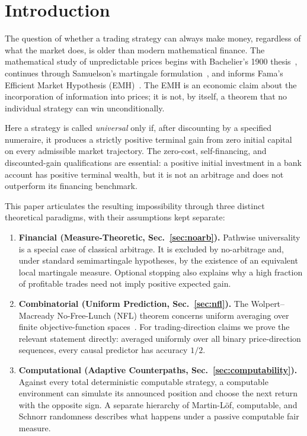 \documentclass[aps,pra,reprint,superscriptaddress,amsmath,amssymb,floatfix]{revtex4-2}
\theoremstyle{plain}
\theoremstyle{definition}
\theoremstyle{remark}
\begin{document}
\section{Introduction}
\label{sec:intro}

The question of whether a trading strategy can always make money, regardless
of what the market does, is older than modern mathematical finance. The
mathematical study of unpredictable prices begins with Bachelier's 1900
thesis~\cite{Bachelier1900}, continues through Samuelson's martingale
formulation~\cite{Samuelson1965}, and informs Fama's Efficient Market
Hypothesis (EMH)~\cite{Fama1970}. The EMH is an economic claim about the
incorporation of information into prices; it is not, by itself, a theorem that
no individual strategy can win unconditionally.

Here a strategy is called \emph{universal} only if, after discounting by a
specified numeraire, it produces a strictly positive terminal gain from zero
initial capital on every admissible market trajectory. The zero-cost,
self-financing, and discounted-gain qualifications are essential: a positive
initial investment in a bank account has positive terminal wealth, but it is
not an arbitrage and does not outperform its financing benchmark.

This paper articulates the resulting impossibility through three distinct
theoretical paradigms, with their assumptions kept separate:

\begin{enumerate}
  \item \textbf{Financial (Measure-Theoretic, Sec.~\ref{sec:noarb}).}
  Pathwise universality is a special case of classical arbitrage. It is
  excluded by no-arbitrage and, under standard semimartingale hypotheses, by
  the existence of an equivalent local martingale measure. Optional stopping
  also explains why a high fraction of profitable trades need not imply
  positive expected gain.

  \item \textbf{Combinatorial (Uniform Prediction, Sec.~\ref{sec:nfl}).}
  The Wolpert--Macready No-Free-Lunch (NFL) theorem concerns uniform averaging
  over finite objective-function spaces~\cite{Wolpert:1997:NFL:2221336.2221408}.
  For trading-direction claims we prove the relevant statement directly:
  averaged uniformly over all binary price-direction sequences, every causal
  predictor has accuracy \(1/2\).

  \item \textbf{Computational (Adaptive Counterpaths,
  Sec.~\ref{sec:computability}).} Against every total deterministic computable
  strategy, a computable environment can simulate its announced position and
  choose the next return with the opposite sign. A separate
  hierarchy of Martin-L\"of, computable, and Schnorr randomness describes
  what happens under a passive computable fair measure.
\end{enumerate}
\end{document}
